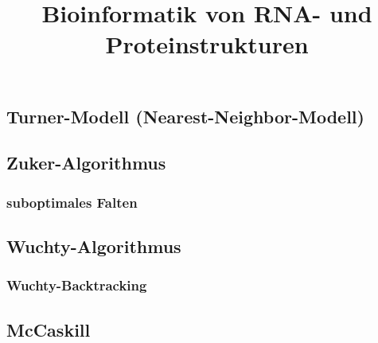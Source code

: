 \documentclass[12pt,a4paper]{article}
\title{\Huge\textbf{Bioinformatik von RNA- und Proteinstrukturen}}
\author{}
\date{}
\begin{document}
\begin{titlepage}

\maketitle
\thispagestyle{empty}
\end{titlepage}
\newpage

\begin{titlepage}
\tableofcontents
\thispagestyle{empty}
\end{titlepage}
\newpage



\newpage



\newpage



\newpage



\newpage



\newpage



\newpage



\newpage


\newpage



\subsection{Turner-Modell (Nearest-Neighbor-Modell)}

\subsection{Zuker-Algorithmus}

\subsubsection{suboptimales Falten}

\subsection{Wuchty-Algorithmus}

\subsubsection{Wuchty-Backtracking}

\subsection{McCaskill}

\newpage



\newpage


\end{document}
